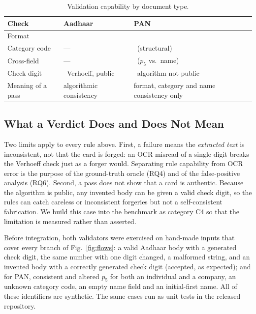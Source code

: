 \documentclass[conference]{IEEEtran}
\newcommand{\cmark}{\textcolor{cfuse}{\ding{51}}}
\newcommand{\xmark}{\textcolor{cbad}{\ding{55}}}
\begin{document}
\begin{table}[!t]
\caption{Validation capability by document type.}
\label{tab:capability}
\centering
\footnotesize
\setlength{\tabcolsep}{4pt}
\renewcommand{\arraystretch}{1.1}
\begin{tabular}{@{}>{\raggedright\arraybackslash}p{2.0cm}>{\raggedright\arraybackslash}p{2.55cm}>{\raggedright\arraybackslash}p{3.0cm}@{}}
\toprule
Check & Aadhaar & PAN \\
\midrule
Format          & \cmark & \cmark \\
Category code   & ---    & \cmark\ (structural) \\
Cross-field     & ---    & \cmark\ ($p_5$ vs.\ name) \\
Check digit     & \cmark\ Verhoeff, public & \xmark\ algorithm not public \\
Meaning of a pass & algorithmic consistency & format, category and name consistency only \\
\bottomrule
\end{tabular}
\end{table}

\subsection{What a Verdict Does and Does Not Mean}
\label{sec:limitations}

Two limits apply to every rule above. First, a failure means the
\emph{extracted text} is inconsistent, not that the card is forged: an
OCR misread of a single digit breaks the Verhoeff check just as a forger
would. Separating rule capability from OCR error is the purpose of the
ground-truth oracle (RQ4) and of the false-positive analysis (RQ6).
Second, a pass does not show that a card is authentic. Because the
algorithm is public, any invented body can be given a valid check digit,
so the rules can catch careless or inconsistent forgeries but not a
self-consistent fabrication. We build this case into the benchmark as
category C4 so that the limitation is measured rather than asserted.

Before integration, both validators were exercised on hand-made inputs
that cover every branch of Fig.~\ref{fig:flows}: a valid Aadhaar body
with a generated check digit, the same number with one digit changed,
a malformed string, and an invented body with a correctly generated
check digit (accepted, as expected); and for PAN, consistent and
altered $p_5$ for both an individual and a company, an unknown category
code, an empty name field and an initial-first name. All of these
identifiers are synthetic. The same cases run as unit tests in the
released repository.
\end{document}
